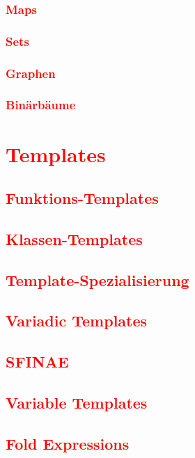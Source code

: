 \subsection{\textcolor{red}{Maps}}\label{sec:maps}
\subsection{\textcolor{red}{Sets}}\label{sec:sets}
\subsection{\textcolor{red}{Graphen}}\label{sec:trees}
\subsection{\textcolor{red}{Binärbäume}}\label{sec:binary-trees}

\cleardoublepage\chapter{\textcolor{red}{Templates}}\label{chap:templates}
\section{\textcolor{red}{Funktions-Templates}}\label{sec:function-templates}
\section{\textcolor{red}{Klassen-Templates}}\label{sec:class-templates}
\section{\textcolor{red}{Template-Spezialisierung}}\label{sec:template-specialization}
\section{\textcolor{red}{Variadic Templates}}\label{sec:variadic-templates}
\section{\textcolor{red}{SFINAE}}\label{sec:sfinae}
\section{\textcolor{red}{Variable Templates}}\label{sec:variable-templates}
\section{\textcolor{red}{Fold Expressions}}\label{sec:fold-expressions}

